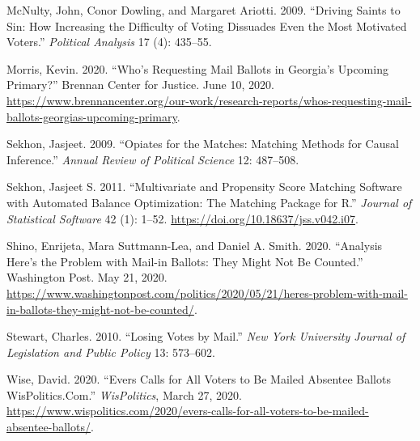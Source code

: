\documentclass[
  12pt,
]{article}
\newlength{\cslhangindent}
\newenvironment{cslreferences}%
  {\setlength{\parindent}{0pt}%
  \everypar{\setlength{\hangindent}{\cslhangindent}}\ignorespaces}%
  {\par}
\begin{document}
\begin{cslreferences}
\leavevmode\hypertarget{ref-McNulty2009}{}%
McNulty, John, Conor Dowling, and Margaret Ariotti. 2009. ``Driving Saints to Sin: How Increasing the Difficulty of Voting Dissuades Even the Most Motivated Voters.'' \emph{Political Analysis} 17 (4): 435--55.

\leavevmode\hypertarget{ref-Morris2020}{}%
Morris, Kevin. 2020. ``Who's Requesting Mail Ballots in Georgia's Upcoming Primary?'' Brennan Center for Justice. June 10, 2020. \url{https://www.brennancenter.org/our-work/research-reports/whos-requesting-mail-ballots-georgias-upcoming-primary}.

\leavevmode\hypertarget{ref-Sekhon2009}{}%
Sekhon, Jasjeet. 2009. ``Opiates for the Matches: Matching Methods for Causal Inference.'' \emph{Annual Review of Political Science} 12: 487--508.

\leavevmode\hypertarget{ref-Sekhon2011}{}%
Sekhon, Jasjeet S. 2011. ``Multivariate and Propensity Score Matching Software with Automated Balance Optimization: The Matching Package for R.'' \emph{Journal of Statistical Software} 42 (1): 1--52. \url{https://doi.org/10.18637/jss.v042.i07}.

\leavevmode\hypertarget{ref-Shino2020}{}%
Shino, Enrijeta, Mara Suttmann-Lea, and Daniel A. Smith. 2020. ``Analysis \textbar{} Here's the Problem with Mail-in Ballots: They Might Not Be Counted.'' Washington Post. May 21, 2020. \url{https://www.washingtonpost.com/politics/2020/05/21/heres-problem-with-mail-in-ballots-they-might-not-be-counted/}.

\leavevmode\hypertarget{ref-Stewart2010}{}%
Stewart, Charles. 2010. ``Losing Votes by Mail.'' \emph{New York University Journal of Legislation and Public Policy} 13: 573--602.

\leavevmode\hypertarget{ref-Wise2020}{}%
Wise, David. 2020. ``Evers Calls for All Voters to Be Mailed Absentee Ballots \textbar{} WisPolitics.Com.'' \emph{WisPolitics}, March 27, 2020. \url{https://www.wispolitics.com/2020/evers-calls-for-all-voters-to-be-mailed-absentee-ballots/}.
\end{cslreferences}
\end{document}
